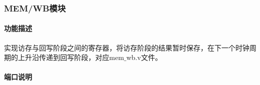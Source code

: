 \subsubsection{MEM/WB模块}
\paragraph{功能描述}
\quad

\quad

实现访存与回写阶段之间的寄存器，将访存阶段的结果暂时保存，在下一个时钟周期的上升沿传递到回写阶段，对应mem$\_$wb.v文件。
\paragraph{端口说明}
\quad

\quad
